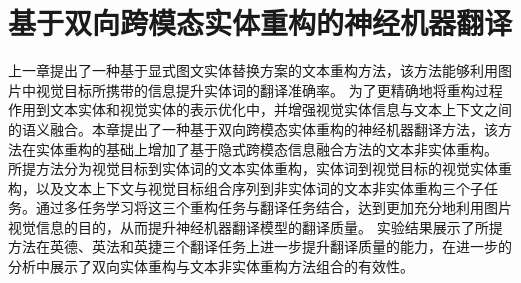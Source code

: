 \chapter{基于双向跨模态实体重构的神经机器翻译}

上一章提出了一种基于显式图文实体替换方案的文本重构方法，该方法能够利用图片中视觉目标所携带的信息提升实体词的翻译准确率。
为了更精确地将重构过程作用到文本实体和视觉实体的表示优化中，并增强视觉实体信息与文本上下文之间的语义融合。本章提出了一种基于双向跨模态实体重构的神经机器翻译方法，该方法在实体重构的基础上增加了基于隐式跨模态信息融合方法的文本非实体重构。
所提方法分为视觉目标到实体词的文本实体重构，实体词到视觉目标的视觉实体重构，以及文本上下文与视觉目标组合序列到非实体词的文本非实体重构三个子任务。通过多任务学习将这三个重构任务与翻译任务结合，达到更加充分地利用图片视觉信息的目的，从而提升神经机器翻译模型的翻译质量。
实验结果展示了所提方法在英德、英法和英捷三个翻译任务上进一步提升翻译质量的能力，在进一步的分析中展示了双向实体重构与文本非实体重构方法组合的有效性。








